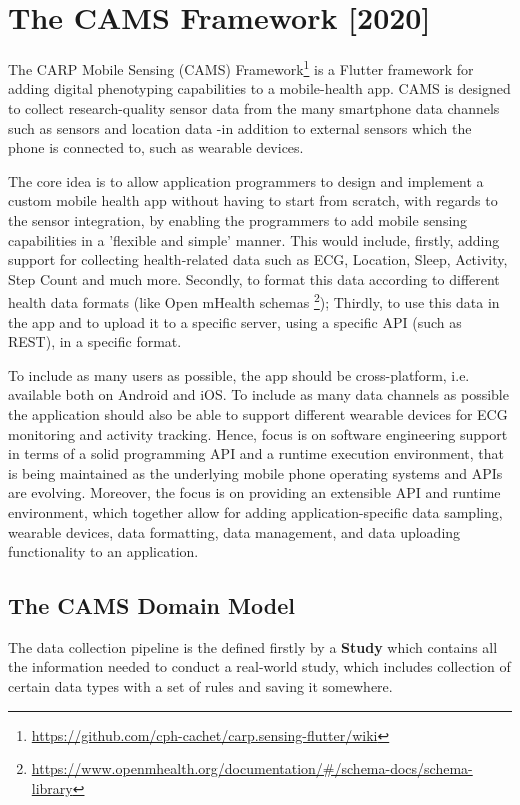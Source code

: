 \section{The CAMS Framework [2020]}
The CARP Mobile Sensing (CAMS) Framework\footnote{\url{https://github.com/cph-cachet/carp.sensing-flutter/wiki}} is a Flutter framework for adding digital phenotyping capabilities to a mobile-health app. CAMS is designed to collect research-quality sensor data from the many smartphone data channels such as sensors and location data -in addition to external sensors which the phone is connected to, such as wearable devices.  

The core idea is to allow application programmers to design and implement a custom mobile health app without having to start from scratch, with regards to the sensor integration, by enabling the programmers to add mobile sensing capabilities in a 'flexible and simple' manner. This would include, firstly, adding support for collecting health-related data such as ECG, Location, Sleep, Activity, Step Count and much more. Secondly, to format this data according to different health data formats (like Open mHealth schemas \footnote{\url{https://www.openmhealth.org/documentation/#/schema-docs/schema-library}}); Thirdly, to use this data in the app and to upload it to a specific server, using a specific API (such as REST), in a specific format.

To include as many users as possible, the app should be cross-platform, i.e. available both on Android and iOS. To include as many data channels as possible the application should also be able to support different wearable devices for ECG monitoring and activity tracking. Hence, focus is on software engineering support in terms of a solid programming API and a runtime execution environment, that is being maintained as the underlying mobile phone operating systems and APIs are evolving. Moreover, the focus is on providing an extensible API and runtime environment, which together allow for adding application-specific data sampling, wearable devices, data formatting, data management, and data uploading functionality to an application.

\subsection{The CAMS Domain Model}
The data collection pipeline is the defined firstly by a \textbf{Study} which contains all the information needed to conduct a real-world study, which includes collection of certain data types with a set of rules and saving it somewhere. 

